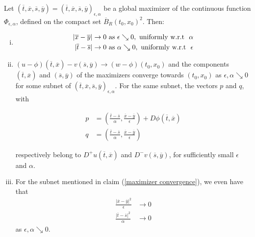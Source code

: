 \begin{lemma}
		 	\label{doubling device}
		 	Let $ (\overline{t}, \overline{x}, \overline{s}, \overline{y}) = (\overline{t}, \overline{x}, \overline{s}, \overline{y})_{\epsilon, \alpha} $ be a global maximizer of the continuous function $ \Phi_{\epsilon, \alpha} $, defined on the compact set $ \overline{B}_R(t_0, x_0)^2 $. Then:
		 	
		 	\begin{enumerate}[(i)]
		 		\item 
		 		\label{distance convergence}
		 		\begin{align*}
		 		\lvert \overline{x} - \overline{y} \rvert &\to 0 \hbox{ as } \epsilon \searrow 0, \hbox{ uniformly w.r.t } \  \alpha \\
		 		\lvert \overline{t} - \overline{s} \rvert &\to 0 \hbox{ as } \alpha \searrow 0, \hbox{ uniformly w.r.t } \ \epsilon 
		 		\end{align*}
		 		
		 		\item
		 		\label{maximizer convergence} 
		 		$ (u - \phi)(\overline{t}, \overline{x}) - v(\overline{s}, \overline{y}) \to (w - \phi)(t_0, x_0) $ and the components $ (\overline{t}, \overline{x}) $ and $ (\overline{s}, \overline{y}) $ of the maximizers converge towards $ (t_0, x_0) $ as $ \epsilon, \alpha \searrow 0 $ for some subnet of $ (\overline{t}, \overline{x}, \overline{s}, \overline{y})_{\epsilon, \alpha} $. 
		 		For the same subnet, the vectors $ p $ and $ q $, with
		 		
		 		\begin{align*}
		 			p &= \left( \frac{\overline{t} - \overline{s}}{\alpha}, \frac{\overline{x} - \overline{y}}{\epsilon} \right) + D\phi(\overline{t}, \overline{x}) \\
		 			q &= \left( \frac{\overline{t} - \overline{s}}{\alpha}, \frac{\overline{x} - \overline{y}}{\epsilon} \right)
		 		\end{align*}
		 		
		 		respectively belong to $ D^{+}u(\overline{t}, \overline{x}) $ and $ D^{-}v(\overline{s}, \overline{y}) $, for sufficiently small $ \epsilon $ and $ \alpha $.
		 		
		 		\item
		 		\label{fast convergence}
		 		For the subnet mentioned in claim (\ref{maximizer convergence}), we even have that
		 		\begin{align*}
		 			\frac{\lvert \overline{x} - \overline{y} \rvert^2}{\epsilon} &\to 0 \\
		 			\frac{\lvert \overline{t} - \overline{s} \rvert^2}{\alpha} &\to 0 
		 		\end{align*} 
		 		as $ \epsilon, \alpha \searrow 0 $.
		 	\end{enumerate}
	 	

\end{lemma}
